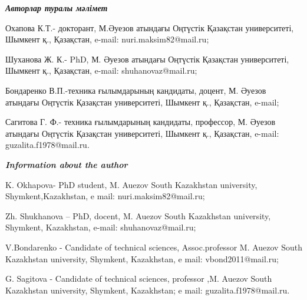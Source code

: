 \begin{noparindent}
\hspace{1em}\emph{{\bfseries Авторлар туралы мәлімет}}

Охапова К.Т.- докторант, М.Әуезов атындағы Оңтүстік Қазақстан
университеті, Шымкент қ., Қазақстан, e-mail: nuri.maksim82@mail.ru;

Шуханова Ж. К.- PhD, М. Әуезов атындағы Оңтүстік Қазақстан университеті,
Шымкент қ., Қазақстан, e-mail: shuhanovaz@mail.ru;

Бондаренко В.П.-техника ғылымдарының кандидаты, доцент, М. Әуезов
атындағы Оңтүстік Қазақстан университеті, Шымкент қ., Қазақстан, e-mail;

Сагитова Г. Ф.- техника ғылымдарының кандидаты, профессор, М. Әуезов
атындағы Оңтүстік Қазақстан университеті, Шымкент қ., Қазақстан, e-mail:
guzalita.f1978@mail.ru.

\hspace{1em}\emph{{\bfseries Information about the author}}

K. Okhapova- PhD student, M. Auezov South Kazakhstan university,
Shymkent,Kazakhstan, e mail: nuri.maksim82@mail.ru;

Zh. Shukhanova -- PhD, docent, M. Auezov South Kazakhstan university,
Shymkent, Kazakhstan, e-mail: shuhanovaz@mail.ru;

V.Bondarenko - Candidate of technical sciences, Assoc.professor M.
Auezov South Kazakhstan university, Shymkent, Kazakhstan, e mail:
vbond2011@mail.ru;

G. Sagitova - Candidate of technical sciences, professor ,M. Auezov
South Kazakhstan university, Shymkent, Kazakhstan; e mail:
guzalita.f1978@mail.ru.
\end{noparindent}
